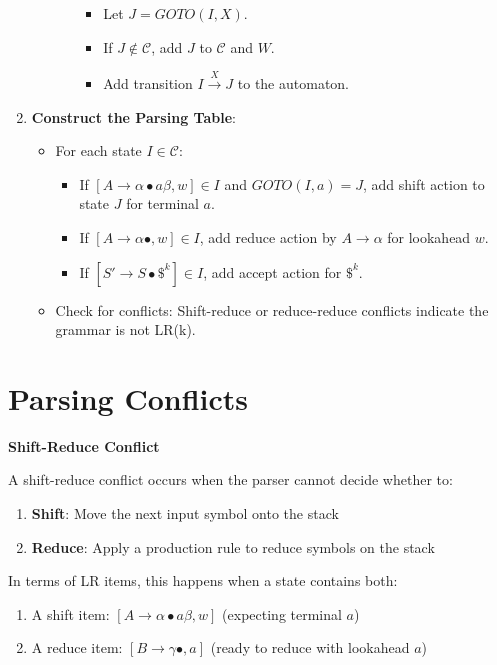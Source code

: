 \begin{enumerate}
\begin{itemize}
\begin{itemize}
       \begin{itemize}
       \item Let $J = GOTO(I, X)$.
       \item If $J \notin \mathcal{C}$, add $J$ to $\mathcal{C}$ and $W$.
       \item Add transition $I \xrightarrow{X} J$ to the automaton.
       \end{itemize}
     \end{itemize}
   \end{itemize}
\item \textbf{Construct the Parsing Table}:
   \begin{itemize}
   \item For each state $I \in \mathcal{C}$:
     \begin{itemize}
     \item If $[A \to \alpha \bullet a \beta, w] \in I$ and $GOTO(I, a) = J$, add shift action to state $J$ for terminal $a$.
     \item If $[A \to \alpha \bullet, w] \in I$, add reduce action by $A \to \alpha$ for lookahead $w$.
     \item If $[S' \to S \bullet \$^k] \in I$, add accept action for $\$^k$.
     \end{itemize}
   \item Check for conflicts: Shift-reduce or reduce-reduce conflicts indicate the grammar is not LR(k).
   \end{itemize}
\end{enumerate}

\section{Parsing Conflicts}

\textbf{Shift-Reduce Conflict}

A shift-reduce conflict occurs when the parser cannot decide whether to:
\begin{enumerate}
\item \textbf{Shift}: Move the next input symbol onto the stack
\item \textbf{Reduce}: Apply a production rule to reduce symbols on the stack
\end{enumerate}

In terms of LR items, this happens when a state contains both:
\begin{enumerate}
\item A shift item: $[A \to \alpha \bullet a \beta, w]$ (expecting terminal $a$)
\item A reduce item: $[B \to \gamma \bullet, a]$ (ready to reduce with lookahead $a$)
\end{enumerate}

